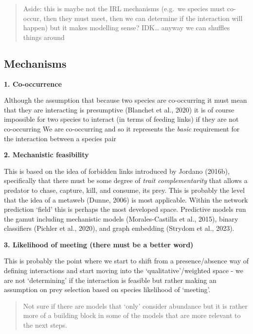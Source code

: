 \documentclass[
]{article}
\begin{document}
\begin{tcolorbox}
\begin{figure}[H]
\end{figure}%

\begin{quote}
Aside: this is maybe not the IRL mechanisms (e.g.~we species must
co-occur, then they must meet, then we can determine if the interaction
will happen) but it makes modelling sense? IDK\ldots{} anyway we can
shuffles things around
\end{quote}

\subsection{Mechanisms}\label{mechanisms}

\textbf{1. Co-occurrence}

Although the assumption that because two species are co-occurring it
must mean that they are interacting is presumptive (Blanchet et al.,
2020) it is of course impossible for two species to interact (in terms
of feeding links) if they are not co-occurring We are co-occurring and
so it represents the \emph{basic} requirement for the interaction
between a species pair

\textbf{2. Mechanistic feasibility}

This is based on the idea of forbidden links introduced by Jordano
(2016b), specifically that there must be some degree of \emph{trait
complementarity} that allows a predator to chase, capture, kill, and
consume, its prey. This is probably the level that the idea of a metaweb
(Dunne, 2006) is most applicable. Within the network prediction `field'
this is perhaps the most developed space. Predictive models run the
gamut including mechanistic models (Morales-Castilla et al., 2015),
binary classifiers (Pichler et al., 2020), and graph embedding (Strydom
et al., 2023).

\textbf{3. Likelihood of meeting (there must be a better word)}

This is probably the point where we start to shift from a
presence/absence way of defining interactions and start moving into the
`qualitative'/weighted space - we are not `determining' if the
interaction is feasible but rather making an assumption on prey
selection based on species likelihood of `meeting'.

\begin{quote}
Not sure if there are models that `only' consider abundance but it is
rather more of a building block in some of the models that are more
relevant to the next steps.
\end{quote}


\end{tcolorbox}
\end{document}
